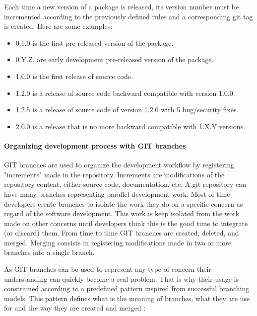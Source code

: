 \documentclass[12pt,a4paper]{article}
\begin{document}
Each time a new version of a package is released, its version number must be incremented according to the previously defined rules and a corresponding git tag is created. Here are some examples:
\begin{itemize}
\item 0.1.0 is the first pre-released version of the package.
\item 0.Y.Z. are early development pre-released version of the package.
\item 1.0.0 is the first release of source code.
\item 1.2.0  is a release of source code backward compatible with version 1.0.0.
\item 1.2.5 is a release of source code of version 1.2.0 with 5 bug/security fixes.
\item 2.0.0 is a release that is no more backward compatible with 1.X.Y versions.
\end{itemize}

\paragraph{Organizing development process with GIT branches}

GIT branches are used to organize the development workflow by registering "increments" made in the repository. Increments are modifications of the repository content, either source code, documentation, etc. A git repository can have many branches representing parallel development work. Most of time developers create branches to isolate the work they do on a specific concern as regard of the software development. This work is keep isolated from the work made on other concerns until developers think this is the good time to integrate (or discard) them. From time to time GIT branches are created, deleted, and merged. Merging consists in registering modifications made in two or more branches into a single branch.

As GIT branches can be used to represent any type of concern their understanding can quickly become a real problem. That is why their usage is constrained according to a predefined pattern inspired from successful branching models. This pattern defines what is the meaning of branches, what they are use for and the way they are created and merged :
\end{document}
